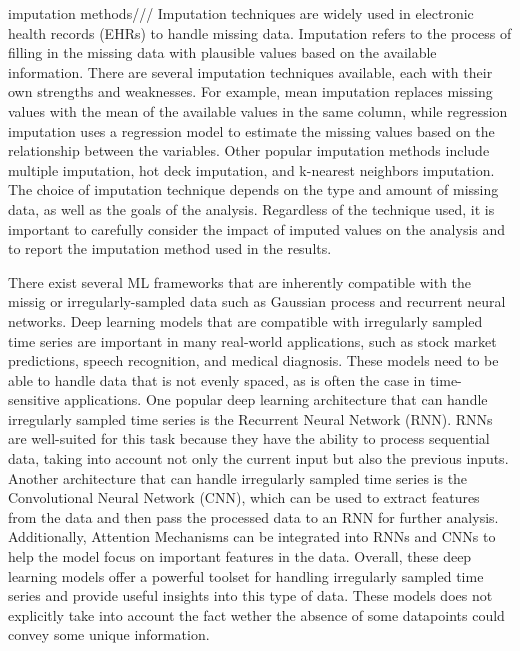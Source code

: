 \documentclass[journal,twoside,web]{ieeecolor}
\begin{document}
imputation methods/// Imputation techniques are widely used in electronic health records (EHRs) to handle missing data. Imputation refers to the process of filling in the missing data with plausible values based on the available information. There are several imputation techniques available, each with their own strengths and weaknesses. For example, mean imputation replaces missing values with the mean of the available values in the same column, while regression imputation uses a regression model to estimate the missing values based on the relationship between the variables. Other popular imputation methods include multiple imputation, hot deck imputation, and k-nearest neighbors imputation. The choice of imputation technique depends on the type and amount of missing data, as well as the goals of the analysis. Regardless of the technique used, it is important to carefully consider the impact of imputed values on the analysis and to report the imputation method used in the results.

There exist several ML frameworks that are inherently compatible with the missig or irregularly-sampled data such as Gaussian process and recurrent neural networks.
Deep learning models that are compatible with irregularly sampled time series are important in many real-world applications, such as stock market predictions, speech recognition, and medical diagnosis. These models need to be able to handle data that is not evenly spaced, as is often the case in time-sensitive applications. One popular deep learning architecture that can handle irregularly sampled time series is the Recurrent Neural Network (RNN). RNNs are well-suited for this task because they have the ability to process sequential data, taking into account not only the current input but also the previous inputs. Another architecture that can handle irregularly sampled time series is the Convolutional Neural Network (CNN), which can be used to extract features from the data and then pass the processed data to an RNN for further analysis. Additionally, Attention Mechanisms can be integrated into RNNs and CNNs to help the model focus on important features in the data. Overall, these deep learning models offer a powerful toolset for handling irregularly sampled time series and provide useful insights into this type of data.
These models does not explicitly take into account the fact wether the absence of some datapoints could convey some unique information.
\end{document}
